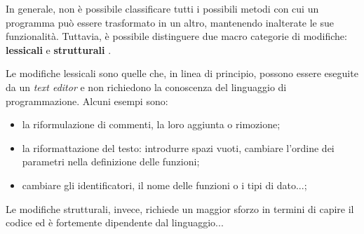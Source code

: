 In generale, non è possibile classificare tutti i possibili metodi con cui un programma può essere trasformato in un altro, mantenendo inalterate le sue funzionalità.
%
Tuttavia, è possibile distinguere due macro categorie di modifiche: \textbf{lessicali} e \textbf{strutturali} \cite{joy-99}.

Le modifiche lessicali sono quelle che, in linea di principio, possono essere eseguite da un \textit{text editor} e non richiedono la conoscenza del linguaggio di programmazione. Alcuni esempi sono:
\begin{itemize}
    \item la riformulazione di commenti, la loro aggiunta o rimozione;
    \item la riformattazione del testo: introdurre spazi vuoti, cambiare l'ordine dei parametri nella definizione delle funzioni;
    \item cambiare gli identificatori, il nome delle funzioni o i tipi di dato...;
\end{itemize}

Le modifiche strutturali, invece, richiede un maggior sforzo in termini di capire il codice ed è fortemente dipendente dal linguaggio...

